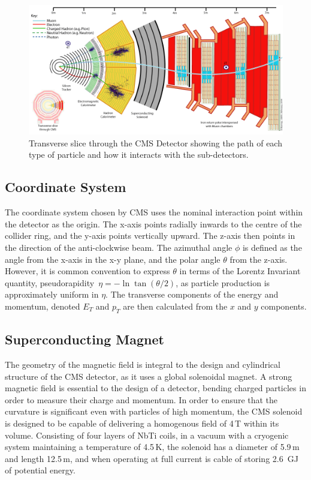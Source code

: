 \begin{figure}
\centering
\includegraphics[width=1.\textwidth]{Figures/Detector/CMS_Slice}
\caption{Transverse slice through the CMS Detector showing the path of each type of particle and how it interacts with the sub-detectors.}
\label{fig:CMS_Slice}
\end{figure}
\subsection{Coordinate System}

The coordinate system chosen by CMS uses the nominal interaction point within the detector as the origin. The x-axis points radially inwards to the centre of the collider ring, and the y-axis points vertically upward. The z-axis then points in the direction of the anti-clockwise beam. The azimuthal angle $\phi$ is defined as the angle from the x-axis in the x-y plane, and the polar angle $\theta$ from the z-axis. However, it is common convention to express $\theta$ in terms of the Lorentz Invariant quantity, pseudorapidity~\begin{math}
\eta = -\ln \tan (\theta / 2) 
\end{math}, as particle production is approximately uniform in $\eta$. The transverse components of the energy and momentum, denoted $E_{T}$ and $p_{T}$ are then calculated from the $x$ and $y$ components. 



\subsection{Superconducting Magnet}

The geometry of the magnetic field is integral to the design and cylindrical structure of the CMS detector, as it uses a global solenoidal magnet. A strong magnetic field is essential to the design of a detector, bending charged particles in order to measure their charge and momentum. In order to ensure that the curvature is significant even with particles of high momentum, the CMS solenoid is designed to be capable of delivering a homogenous field of 4\,T within its volume. Consisting of four layers of NbTi coils, in a vacuum with a cryogenic system maintaining a temperature of 4.5\,K, the solenoid has a diameter of 5.9\,m and length 12.5\,m, and when operating at full current is cable of storing 2.6~GJ of potential energy.

